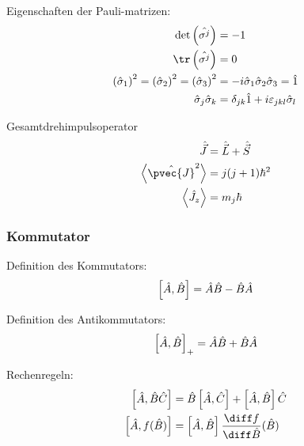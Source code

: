 \documentclass[11pt]{article}
\numberwithin{equation}{section}
\begin{document}
      Eigenschaften der Pauli-matrizen:
      \begin{equation}
        \begin{aligned}
          \det\br{\hat{\sigma^j}} &= -1 \\
          \tr\br{\hat{\sigma^j}} &= 0 \\
          \br{\hat{\sigma}_1}^2 = \br{\hat{\sigma}_2}^2 = \br{\hat{\sigma}_3}^2 &= -i\hat{\sigma}_1\hat{\sigma}_2\hat{\sigma}_3 = \hat{1} \\
          \hat{\sigma}_j \hat{\sigma}_k &= \delta_{jk}\hat{1} + i\varepsilon_{jkl}\hat{\sigma}_l
        \end{aligned}
      \end{equation}



      Gesamtdrehimpulsoperator
      \begin{equation}
        \begin{aligned}
          \hat{\vec{J}} &= \hat{\vec{L}} + \hat{\vec{S}} \\
          \left< \hat{\pvec{J}}^2 \right> &= j(j+1)\hbar^2 \\
          \left< \hat{J}_z \right> &= m_j\hbar \\
        \end{aligned}
      \end{equation}

      \subsubsection{Kommutator}
        Definition des Kommutators:
        \begin{equation}
          \left[\hat{A},\hat{B}\right] = \hat{A}\hat{B} - \hat{B}\hat{A}
        \end{equation}

        Definition des Antikommutators:
        \begin{equation}
          \left[\hat{A},\hat{B}\right]_{+} = \hat{A}\hat{B} + \hat{B}\hat{A}
        \end{equation}

        Rechenregeln:
        \begin{equation}
          \begin{aligned}
            \com{\hat{A}}{\hat{B}\hat{C}}
            &= \hat{B}\com{\hat{A}}{\hat{C}} + \com{\hat{A}}{\hat{B}}\hat{C} \\
            \com{\hat{A}}{f(\hat{B})}
            &= \com{\hat{A}}{\hat{B}}\tder{f}{\hat{B}}(\hat{B})
          \end{aligned}
        \end{equation}
\end{document}
